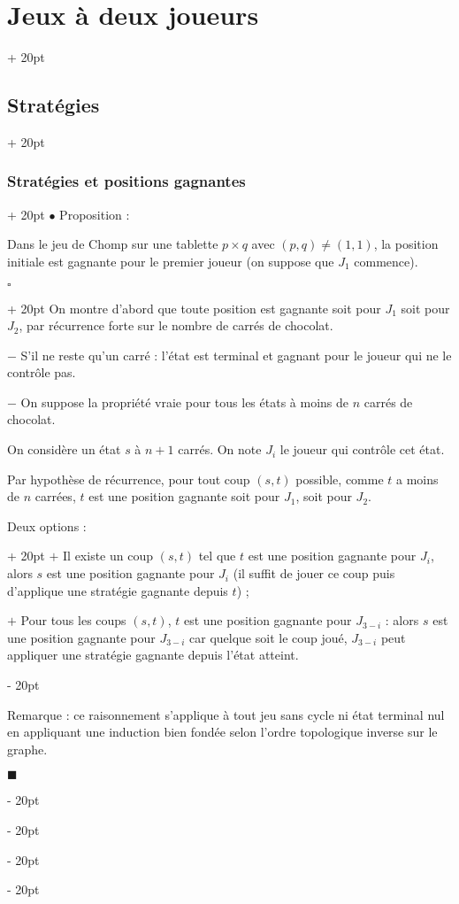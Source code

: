 \documentclass[a4paper, 12pt, twoside]{article}
\newcommand{\ind}[1][20pt]{\advance\leftskip + #1}
\newcommand{\deind}[1][20pt]{\advance\leftskip - #1}
\newenvironment{indt}[2][20pt]{#2 \par \ind[#1]}{\par \deind} %
\newenvironment{proof}[1][{}]{\begin{indt}{$\square$ #1}}{$\blacksquare$ \end{indt}}
\begin{document}
\begin{indt}{\section{Jeux à deux joueurs}}
\begin{indt}{\subsection{Stratégies}}
\begin{indt}{\subsubsection{Stratégies et positions gagnantes}}
                $\bullet$ Proposition :
                \begin{emphBox}
                    Dans le jeu de Chomp sur une tablette $p \times q$ avec $(p, q) \neq (1, 1)$, la position initiale est gagnante pour le premier joueur (on suppose que $J_1$ commence).
                \end{emphBox}

                \vspace{6pt}
                
                \begin{proof}
                    On montre d'abord que toute position est gagnante soit pour $J_1$ soit pour $J_2$, par récurrence forte sur le nombre de carrés de chocolat.

                    $-$ S'il ne reste qu'un carré : l'état est terminal et gagnant pour le joueur qui ne le contrôle pas.

                    $-$ On suppose la propriété vraie pour tous les états à moins de $n$ carrés de chocolat.

                    On considère un état $s$ à $n + 1$ carrés. On note $J_i$ le joueur qui contrôle cet état.

                    Par hypothèse de récurrence, pour tout coup $(s, t)$ possible, comme $t$ a moins de $n$ carrées, $t$ est une position gagnante soit pour $J_1$, soit pour $J_2$.

                    \begin{indt}{Deux options :}
                        $+$ Il existe un coup $(s, t)$ tel que $t$ est une position gagnante pour $J_i$, alors $s$ est une position gagnante pour $J_i$ (il suffit de jouer ce coup puis d'applique une stratégie gagnante depuis $t$) ;

                        $+$ Pour tous les coups $(s, t)$, $t$ est une position gagnante pour $J_{3 - i}$ : alors $s$ est une position gagnante pour $J_{3 - i}$ car quelque soit le coup joué, $J_{3 - i}$ peut appliquer une stratégie gagnante depuis l'état atteint.
                    \end{indt}

                    \vspace{6pt}
                    
                    Remarque : ce raisonnement s'applique à tout jeu sans cycle ni état terminal nul en appliquant une induction bien fondée selon l'ordre topologique inverse sur le graphe.

                    \vspace{6pt}
                    

\end{proof}
\end{indt}
\end{indt}
\end{indt}
\end{document}
